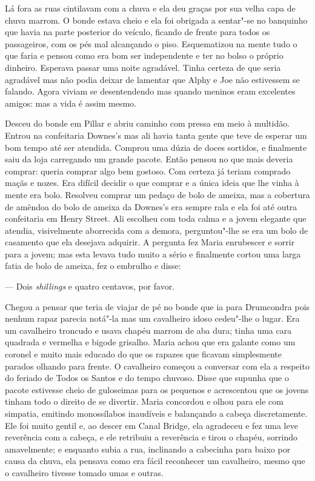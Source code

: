 Lá fora as ruas cintilavam com a chuva e ela deu graças por sua velha capa de
chuva marrom.  O bonde estava cheio e ela foi obrigada a sentar"-se no banquinho
que havia na parte posterior do veículo, ficando de frente para todos os
passageiros, com os pés mal alcançando o piso.  Esquematizou na mente tudo o
que faria e pensou como era bom ser independente e ter no bolso o próprio
dinheiro.  Esperava passar uma noite agradável.  Tinha certeza de que seria
agradável mas não podia deixar de lamentar que Alphy e Joe não estivessem se
falando.  Agora viviam se desentendendo mas quando meninos eram excelentes
amigos: mas a vida é assim mesmo.

Desceu do bonde em Pillar e abriu caminho com pressa em meio à multidão.
Entrou na confeitaria Downes’s mas ali havia tanta gente que teve de esperar um
bom tempo até ser atendida.  Comprou uma dúzia de doces sortidos, e finalmente
saiu da loja carregando um grande pacote.  Então pensou no que mais deveria
comprar: queria comprar algo bem gostoso.  Com certeza já teriam comprado maçãs
e nozes.  Era difícil decidir o que comprar e a única ideia que lhe vinha à
mente era bolo.  Resolveu comprar um pedaço de bolo de ameixa, mas a cobertura
de amêndoa do bolo de ameixa da Downes’s era sempre rala e ela foi até outra
confeitaria em Henry Street.  Ali escolheu com toda calma e a jovem elegante
que atendia, visivelmente aborrecida com a demora, perguntou"-lhe se era um bolo
de casamento que ela desejava adquirir.  A pergunta fez Maria enrubescer e
sorrir para a jovem; mas esta levava tudo muito a sério e finalmente cortou uma
larga fatia de bolo de ameixa, fez o embrulho e disse:

--- Dois \textit{shillings} e quatro centavos, por favor.

Chegou a pensar que teria de viajar de pé no bonde que ia para Drumcondra pois
nenhum rapaz parecia notá"-la mas um cavalheiro idoso cedeu"-lhe o lugar.  Era um
cavalheiro troncudo e usava chapéu marrom de aba dura; tinha uma cara quadrada
e vermelha e bigode grisalho.  Maria achou que era galante como um coronel e
muito mais educado do que os rapazes que ficavam simplesmente parados olhando
para frente.  O cavalheiro começou a conversar com ela a respeito do feriado de
Todos os Santos e do tempo chuvoso.  Disse que supunha que o pacote estivesse
cheio de guloseimas para os pequenos e acrescentou que os jovens tinham todo o
direito de se divertir.  Maria concordou e olhou para ele com simpatia,
emitindo monossílabos inaudíveis e balançando a cabeça discretamente.  Ele foi
muito gentil e, ao descer em Canal Bridge, ela agradeceu e fez uma leve
reverência com a cabeça, e ele retribuiu a reverência e tirou o chapéu,
sorrindo amavelmente; e enquanto subia a rua, inclinando a cabecinha para baixo
por causa da chuva, ela pensava como era fácil reconhecer um cavalheiro, mesmo
que o cavalheiro tivesse tomado umas e outras.

